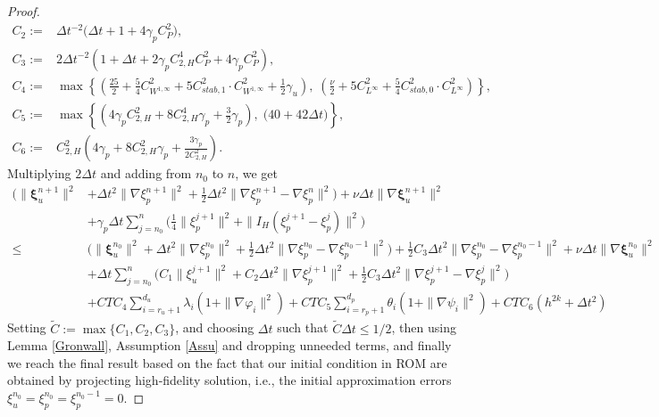 \documentclass[10pt,twoside,openany,UTF8,CJK]{article}
\begin{document}
\begin{proof}
\begin{equation}
\begin{aligned}
		C_2 :=& \Delta t^{-2}\bigg(\Delta t + 1 + 4\gamma_p C^2_{P}\bigg), \\
		C_3 :=& 2\Delta t^{-2}\left(1 + \Delta t + 2\gamma_p C^4_{2,H}C^2_{P} + 4\gamma_p C^2_{P}\right), \\
		C_4 :=& \max\left\{\left(\frac{25}{2} + \frac{5}{4}C^2_{W^{1,\infty}} + 5C^2_{stab,1}\cdot C^2_{W^{1,\infty}} + \frac12\gamma_u\right),\;\left(\frac{\nu}{2} + 5C^2_{L^{\infty}} + \frac54C^2_{stab,0}\cdot C^2_{L^{\infty}}\right)\right\}, \\
		C_5 :=& \max\left\{\left(4\gamma_p C^2_{2,H} + 8C^4_{2,H}\gamma_p + \frac32\gamma_p \right),\;\bigg(40 + 42\Delta t\bigg)\right\}, \\
		C_6 :=& C^2_{2,H}\left(4\gamma_p + 8C^2_{2,H}\gamma_p + \frac{3\gamma_p}{2C^2_{2,H}}\right).
	\end{aligned}		
    \end{equation}
	Multiplying	$2\Delta t$ and adding from $n_0$ to $n$, we get
	$$
	\begin{aligned}	
		\bigg(\|\boldsymbol{\xi}^{n+1}_u\|^2 &+ \Delta t^2\|\nabla \xi^{n+1}_p\|^2 + \frac12\Delta t^2\|\nabla\xi^{n+1}_p - \nabla\xi^{n}_p\|^2\bigg) + \nu\Delta t\|\nabla\boldsymbol{\xi}^{n+1}_u\|^2 \\
		&+ \gamma_p\Delta t\sum_{j=n_0}^{n}\bigg(\frac14\|\xi^{j+1}_p\|^2 + \|I_H(\xi^{j+1}_p - \xi^{j}_p)\|^2\bigg) \\
		\leq & \bigg(\|\boldsymbol{\xi}^{n_0}_u\|^2 + \Delta t^2\|\nabla \xi^{n_0}_p\|^2 + \frac12\Delta t^2\|\nabla\xi^{n_0}_p - \nabla\xi^{n_0-1}_p\|^2\bigg) + \frac12C_3\Delta t^2\|\nabla\xi^{n_0}_p - \nabla\xi^{n_0-1}_p\|^2  + \nu\Delta t\|\nabla\boldsymbol{\xi}^{n_0}_u\|^2 \\
		&+ \Delta t\sum_{j=n_0}^{n}\bigg(C_1\|\xi^{j+1}_u\|^2 + C_2\Delta t^2\|\nabla\xi^{j+1}_p\|^2 + \frac12C_3\Delta t^2\|\nabla\xi^{j+1}_p - \nabla\xi^{j}_p\|^2\bigg) \\
		&+ CTC_4\sum_{i=r_u+1}^{d_u}\lambda_i\left(1 + \|\nabla\varphi_i\|^2\right) + CTC_5\sum_{i=r_p+1}^{d_p}\theta_i\left(1 + \|\nabla\psi_i\|^2\right) +CTC_6\left(h^{2k} + \Delta t^2\right)
	\end{aligned}$$		
	Setting $\tilde{C}:=\max\{C_1,C_2,C_3\}$, and choosing $\Delta t$ such that $\tilde{C}\Delta t \leq 1/2$, then using Lemma \ref{Gronwall}, Assumption \ref{Assu} and dropping unneeded terms, and finally we reach the final result based on the fact that our initial condition in ROM are obtained by projecting high-fidelity solution, i.e., the initial approximation errors $\xi^{n_0}_u=\xi^{n_0}_p=\xi^{n_0-1}_p=0$.		
	\end{proof}		
\end{document}
